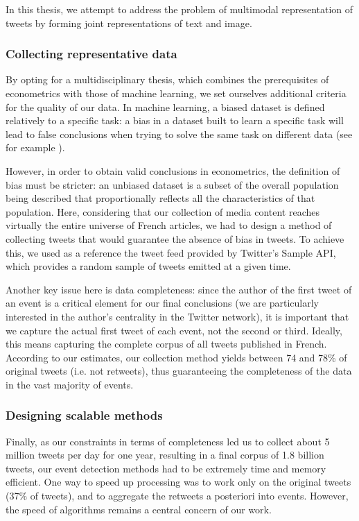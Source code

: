 In this thesis, we attempt to address the problem of multimodal representation of tweets by forming joint representations of text and image.

\subsubsection{Collecting representative data}

By opting for a multidisciplinary thesis, which combines the prerequisites of econometrics with those of machine learning, we set ourselves additional criteria for the quality of our data. In machine learning, a biased dataset is defined relatively to a specific task: a bias in a dataset built to learn a specific task will lead to false conclusions when trying to solve the same task on different data (see for example \citep{tommasi2017deeper}).

However, in order to obtain valid conclusions in econometrics, the definition of bias must be stricter: an unbiased dataset is a subset of the overall population being described that proportionally reflects all the characteristics of that population. Here, considering that our collection of media content reaches virtually the entire universe of French articles, we had to design a method of collecting tweets that would guarantee the absence of bias in tweets. To achieve this, we used as a reference the tweet feed provided by Twitter's Sample API, which provides a random sample of tweets emitted at a given time.

Another key issue here is data completeness: since the author of the first tweet of an event is a critical element for our final conclusions (we are particularly interested in the author's centrality in the Twitter network), it is important that we capture the actual first tweet of each event, not the second or third. Ideally, this means capturing the complete corpus of all tweets published in French. According to our estimates, our collection method yields between 74 and 78\% of original tweets (i.e. not retweets), thus guaranteeing the completeness of the data in the vast majority of events.

\subsubsection{Designing scalable methods}
Finally, as our constraints in terms of completeness led us to collect about 5 million tweets per day for one year, resulting in a final corpus of 1.8 billion tweets, our event detection methods had to be extremely time and memory efficient. One way to speed up processing was to work only on the original tweets (37\% of tweets), and to aggregate the retweets a posteriori into events. However, the speed of algorithms remains a central concern of our work. 

